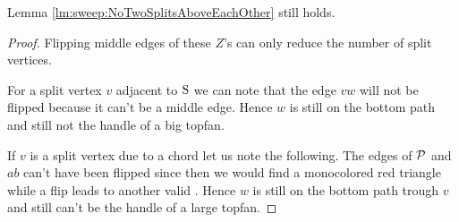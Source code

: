     \begin{lemma}
      \label{lm:sweep:NoTwoSplitsAboveEachOtherVertOnesided}
      Lemma \ref{lm:sweep:NoTwoSplitsAboveEachOther} still holds.
    \end{lemma}

    \begin{proof}
      Flipping middle edges of these $Z$'s  can only reduce the number of split vertices.

      For a split vertex $v$ adjacent to $\pS$ we can note that the edge $vw$ will not be flipped because it can't be a middle edge. Hence $w$ is still on the bottom path and still not the handle of a big topfan.

      If $v$ is a split vertex due to a chord let us note the following.
      The edges of $\P$ and $ab$ can't have been flipped since then we would find a monocolored red triangle while a flip leads to another valid \rel. Hence $w$ is still on the bottom path trough $v$ and still can't be the handle of a large topfan.
    \end{proof}
